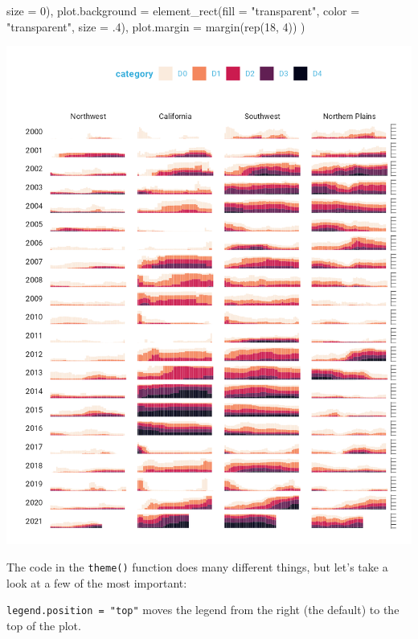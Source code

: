 \documentclass[
]{book}
\newenvironment{Shaded}{\begin{snugshade}}{\end{snugshade}}
\newcommand{\AttributeTok}[1]{\textcolor[rgb]{0.77,0.63,0.00}{#1}}
\newcommand{\DecValTok}[1]{\textcolor[rgb]{0.00,0.00,0.81}{#1}}
\newcommand{\FunctionTok}[1]{\textcolor[rgb]{0.00,0.00,0.00}{#1}}
\newcommand{\NormalTok}[1]{#1}
\newcommand{\StringTok}[1]{\textcolor[rgb]{0.31,0.60,0.02}{#1}}
\begin{document}
\begin{Shaded}
\begin{Highlighting}[]
                                \AttributeTok{size =} \DecValTok{0}\NormalTok{),}
    \AttributeTok{plot.background =} \FunctionTok{element\_rect}\NormalTok{(}\AttributeTok{fill =} \StringTok{"transparent"}\NormalTok{, }
                                   \AttributeTok{color =} \StringTok{"transparent"}\NormalTok{, }
                                   \AttributeTok{size =}\NormalTok{ .}\DecValTok{4}\NormalTok{),}
    \AttributeTok{plot.margin =} \FunctionTok{margin}\NormalTok{(}\FunctionTok{rep}\NormalTok{(}\DecValTok{18}\NormalTok{, }\DecValTok{4}\NormalTok{))}
\NormalTok{  )}
\end{Highlighting}
\end{Shaded}

\includegraphics[width=1\linewidth]{data-viz_files/figure-latex/unnamed-chunk-38-1}

The code in the \texttt{theme()} function does many different things, but let's take a look at a few of the most important:

\texttt{legend.position\ =\ "top"} moves the legend from the right (the default) to the top of the plot.
\end{document}
